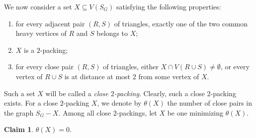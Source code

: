 \documentclass[12pt, oneside]{scrartcl}
\newtheorem{claim}{Claim}[section]
\begin{document}
We now consider a set $X \subseteq V(S_G)$ satisfying the following properties:
\begin{enumerate}
    \item for every adjacent pair $(R,S)$ of triangles, exactly one of the two common heavy vertices of $R$ and $S$ belongs to $X$;
    \item $X$ is a $2$-packing;
    \item for every close pair $(R,S)$ of triangles, either $X \cap V(R\cup S)\neq \emptyset$, or every vertex of $R\cup S$ is at distance at most $2$ from some vertex of $X$.
\end{enumerate}
Such a set $X$ will be called a \textit{close $2$-packing}. Clearly, such a close 2-packing exists. For a close $2$-packing $X$, we denote by $\theta(X)$ the number of close pairs in the graph $S_G-X$. Among all close $2$-packings, let $X$ be one minimizing $\theta(X)$. 
\begin{claim}\label{l6}
$\theta(X)=0$.
\end{claim}
\end{document}
